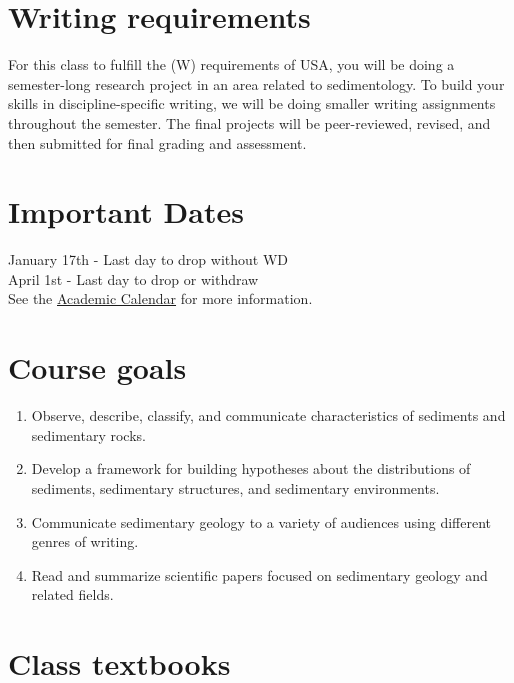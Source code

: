 \documentclass[11pt,]{article}
\begin{document}
\hypertarget{writing-requirements}{%
\section{Writing requirements}\label{writing-requirements}}

For this class to fulfill the (W) requirements of USA, you will be doing
a semester-long research project in an area related to sedimentology. To
build your skills in discipline-specific writing, we will be doing
smaller writing assignments throughout the semester. The final projects
will be peer-reviewed, revised, and then submitted for final grading and
assessment.

\hypertarget{important-dates}{%
\section{Important Dates}\label{important-dates}}

January 17th - Last day to drop without WD\\
April 1st - Last day to drop or withdraw\\
See the \href{https://www.southalabama.edu/academiccalendar/}{Academic
Calendar} for more information.

\newpage

\hypertarget{course-goals}{%
\section{Course goals}\label{course-goals}}

\begin{enumerate}
\def\labelenumi{\arabic{enumi}.}
\item
  Observe, describe, classify, and communicate characteristics of
  sediments and sedimentary rocks.
\item
  Develop a framework for building hypotheses about the distributions of
  sediments, sedimentary structures, and sedimentary environments.
\item
  Communicate sedimentary geology to a variety of audiences using
  different genres of writing.
\item
  Read and summarize scientific papers focused on sedimentary geology
  and related fields.
\end{enumerate}

\hypertarget{class-textbooks}{%
\section{Class textbooks}\label{class-textbooks}}
\end{document}
